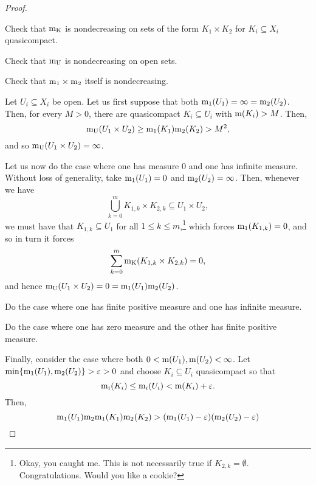 \begin{dfn}
\begin{prp}
\begin{savenotes}
\begin{proof}
\begin{exr}
Check that $\mathrm{m} _{\mathrm{K}}$ is nondecreasing on sets of the form $K_1\times K_2$ for $K_i\subseteq X_i$ quasicompact.
\end{exr}
\begin{exr}
Check that $\mathrm{m} _{\mathrm{U}}$ is nondecreasing on open sets.
\end{exr}
\begin{exr}
Check that $\mathrm{m} _1\times \mathrm{m} _2$ itself is nondecreasing.
\end{exr}

Let $U_i\subseteq X_i$ be open.  Let us first suppose that both $\mathrm{m} _1(U_1)=\infty =\mathrm{m} _2(U_2)$.  Then, for every $M>0$, there are quasicompact $K_i\subseteq U_i$ with $\mathrm{m} (K_i)>M$.  Then,
\begin{equation}
\mathrm{m} _{\mathrm{U}}(U_1\times U_2)\geq \mathrm{m} _1(K_1)\mathrm{m} _2(K_2)>M^2,
\end{equation}
and so $\mathrm{m} _{\mathrm{U}}(U_1\times U_2)=\infty$.

Let us now do the case where one has measure $0$ and one has infinite measure.  Without loss of generality, take $\mathrm{m} _1(U_1)=0$ and $\mathrm{m} _2(U_2)=\infty$.  Then, whenever we have
\begin{equation}
\bigcup _{k=0}^mK_{1,k}\times K_{2,k}\subseteq U_1\times U_2,
\end{equation}
we must have that $K_{1,k}\subseteq U_1$ for all $1\leq k\leq m$,\footnote{Okay, you caught me.  This is not necessarily true if $K_{2,k}=\emptyset$.  Congratulations.  Would you like a cookie?} which forces $\mathrm{m} _1(K_{1,k})=0$, and so in turn it forces
\begin{equation}
\sum _{k=0}^m\mathrm{m} _{\mathrm{K}}(K_{1,k}\times K_{2,k})=0,
\end{equation}
and hence $\mathrm{m} _{\mathrm{U}}(U_1\times U_2)=0=\mathrm{m} _1(U_1)\mathrm{m} _2(U_2)$.

\begin{exr}
Do the case where one has finite positive measure and one has infinite measure.
\end{exr}
\begin{exr}
Do the case where one has zero measure and the other has finite positive measure.
\end{exr}

Finally, consider the case where both $0<\mathrm{m} (U_1),\mathrm{m} (U_2)<\infty$.  Let $\min \{ \mathrm{m} _1(U_1),\mathrm{m} _2(U_2)\} >\varepsilon >0$ and choose $K_i\subseteq U_i$ quasicompact so that
\begin{equation}
\mathrm{m} _i(K_i)\leq \mathrm{m} _i(U_i)<\mathrm{m} (K_i)+\varepsilon .
\end{equation}
Then,
\begin{equation}
\mathrm{m} _1(U_1)\mathrm{m} _2\mathrm{m} _1(K_1)\mathrm{m} _2(K_2)>(\mathrm{m} _1(U_1)-\varepsilon )(\mathrm{m} _2(U_2)-\varepsilon )
\end{equation}


\end{proof}
\end{savenotes}
\end{prp}
\end{dfn}
